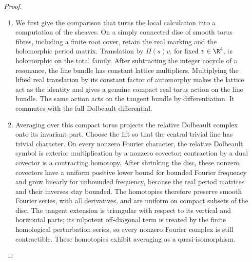 \begin{proof}
\begin{enumerate}[label=\arabic*.,leftmargin=*]
\item We first give the comparison that turns the local calculation into
a computation of the sheaves. On a simply connected disc of smooth
torus fibres, including a finite root cover, retain the real marking
and the holomorphic period matrix. Translation by $\Pi(s)v$, for
fixed $v\in\R^4$, is holomorphic on the total family. After
subtracting the integer cocycle of a resonance, the line bundle has
constant lattice multipliers. Multiplying the lifted real translation
by its constant factor of automorphy makes the lattice act as the
identity and gives a genuine compact real torus action on the line
bundle. The same action acts on the tangent bundle by differentiation.
It commutes with the full Dolbeault differential.

\item Averaging over this compact torus projects the relative Dolbeault
complex onto its invariant part. Choose the lift so that the central
trivial line has trivial character. On every nonzero Fourier character,
the relative Dolbeault symbol is exterior multiplication by a
nonzero covector; contraction by a dual covector is a contracting
homotopy. After shrinking the disc, these nonzero covectors have a
uniform positive lower bound for bounded Fourier frequency and grow
linearly for unbounded frequency, because the real period matrices
and their inverses stay bounded. The homotopies therefore preserve
smooth Fourier series, with all derivatives, and are uniform on
compact subsets of the disc. The tangent extension is triangular
with respect to its vertical and horizontal parts; its nilpotent
off-diagonal term is treated by the finite homological perturbation
series, so every nonzero Fourier complex is still contractible.
These homotopies exhibit averaging as a quasi-isomorphism.


\end{enumerate}
\end{proof}
